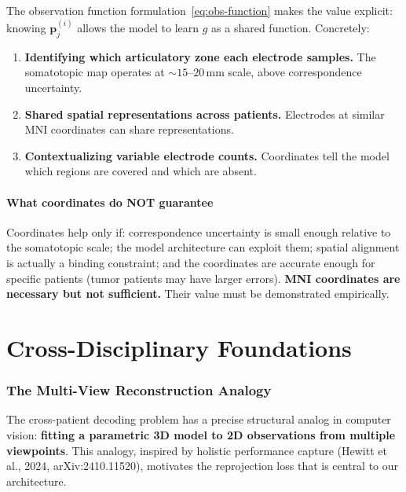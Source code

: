 \documentclass[11pt,letterpaper]{article}
\newcommand{\bfp}{\mathbf{p}}
\begin{document}
The observation function formulation~\eqref{eq:obs-function} makes the value explicit: knowing $\bfp_j^{(i)}$ allows the model to learn $g$ as a shared function. Concretely:

\begin{enumerate}[leftmargin=2em]
\item \textbf{Identifying which articulatory zone each electrode samples.} The somatotopic map operates at ${\sim}15$--$20$\,mm scale, above correspondence uncertainty.
\item \textbf{Shared spatial representations across patients.} Electrodes at similar MNI coordinates can share representations.
\item \textbf{Contextualizing variable electrode counts.} Coordinates tell the model which regions are covered and which are absent.
\end{enumerate}

\subsection{What coordinates do NOT guarantee}

Coordinates help only if: correspondence uncertainty is small enough relative to the somatotopic scale; the model architecture can exploit them; spatial alignment is actually a binding constraint; and the coordinates are accurate enough for specific patients (tumor patients may have larger errors). \textbf{MNI coordinates are necessary but not sufficient.} Their value must be demonstrated empirically.



\part{Cross-Disciplinary Foundations}

\section{The Multi-View Reconstruction Analogy}\label{sec:analogy}

The cross-patient decoding problem has a precise structural analog in computer vision: \textbf{fitting a parametric 3D model to 2D observations from multiple viewpoints}. This analogy, inspired by holistic performance capture (Hewitt et al., 2024, arXiv:2410.11520), motivates the reprojection loss that is central to our architecture.
\end{document}
